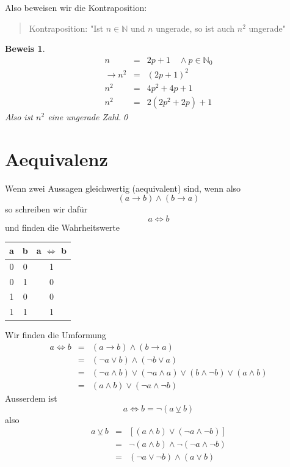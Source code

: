 \documentclass{report}
\newtheorem{myproof}{Beweis}
\begin{document}
Also beweisen wir die Kontraposition:
\begin{quote}{Kontraposition}: "Ist $n \in \mathbb{N}$ und $n$ ungerade, so ist auch $n^2$ ungerade"\end{quote}
\begin{myproof}\begin{eqnarray} 
n &=& 2p + 1 \quad \land p \in \mathbb{N}_0 \nonumber \\
\to n^2 &=& (2p + 1)^2 \nonumber \\
n^2 &=& 4p^2 + 4p + 1 \nonumber \\
n^2 &=& 2 (2p^2 + 2p) + 1\label{eq:nungerade} \end{eqnarray}
Also ist $n^2$ eine ungerade Zahl.\qed\end{myproof}

\section{Aequivalenz}
Wenn zwei Aussagen gleichwertig (aequivalent) sind, wenn also
\begin{equation}(a \to b) \land (b \to a)\end{equation}
so schreiben wir dafür
\begin{equation}a \iff b\end{equation}
und finden die Wahrheitswerte
\begin{center}\begin{tabular}{c c | c}
a & b & a \(\iff\) b\\
\hline
0 & 0 & 1 \\
0 & 1 & 0 \\
1 & 0 & 0 \\
1 & 1 & 1 \\
\end{tabular}\end{center}
Wir finden die Umformung
\begin{eqnarray}
a \iff b &=& (a \to b) \land (b \to a)\nonumber \\
&=& (\lnot a \lor b) \land (\lnot b \lor a)\nonumber \\
&=& (\lnot a \land b) \lor (\lnot a \land a) \lor (b \land \lnot b) \lor (a \land b) \nonumber \\
&=& (a \land b) \lor (\lnot a \land \lnot b)
\end{eqnarray}
Ausserdem ist 
\begin{equation}a \iff b = \lnot (a \veebar b)\end{equation}
also
\begin{eqnarray}a \veebar b &=& [(a \land b) \lor (\lnot a \land \lnot b)] \nonumber \\
&=&\lnot(a \land b) \land \lnot (\lnot a \land \lnot b) \nonumber \\
&=&(\lnot a \lor \lnot b) \land (a \lor b)\end{eqnarray}
\end{document}
